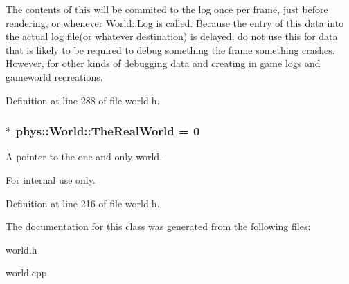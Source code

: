 The contents of this will be commited to the log once per frame, just before rendering, or whenever \hyperlink{classphys_1_1World_a05267a20e8d5518771d0848190b33d60}{World::Log} is called. Because the entry of this data into the actual log file(or whatever destination) is delayed, do not use this for data that is likely to be required to debug something the frame something crashes. However, for other kinds of debugging data and creating in game logs and gameworld recreations. 

Definition at line 288 of file world.h.

\hypertarget{classphys_1_1World_a78f9e764aa85ac44d6f7fa7158377757}{
\subsubsection[{TheRealWorld}]{ $\ast$ {\bf phys::World::TheRealWorld} = 0}}
\label{da/ddf/classphys_1_1World_a78f9e764aa85ac44d6f7fa7158377757}


A pointer to the one and only world. 

\begin{DoxyInternal}{For internal use only.}
\end{DoxyInternal}


Definition at line 216 of file world.h.



The documentation for this class was generated from the following files:\begin{DoxyCompactItemize}
\item 
world.h\item 
world.cpp\end{DoxyCompactItemize}
